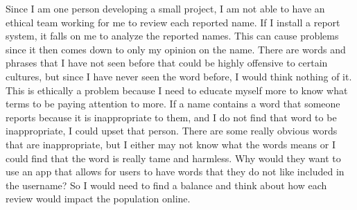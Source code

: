 \documentclass[10pt,twocolumn]{article}
\begin{document}
	 Since I am one person developing a small project, I am not able to have an ethical team working for me to review each reported name. If I install a report system, it falls on me to analyze the reported names. This can cause problems since it then comes down to only my opinion on the name. There are words and phrases that I have not seen before that could be highly offensive to certain cultures, but since I have never seen the word before, I would think nothing of it. This is ethically a problem because I need to educate myself more to know what terms to be paying attention to more. If a name contains a word that someone reports because it is inappropriate to them, and I do not find that word to be inappropriate, I could upset that person. There are some really obvious words that are inappropriate, but I either may not know what the words means or I could find that the word is really tame and harmless. Why would they want to use an app that allows for users to have words that they do not like included in the username? So I would need to find a balance and think about how each review would impact the population online.
	 	 
\end{document}
